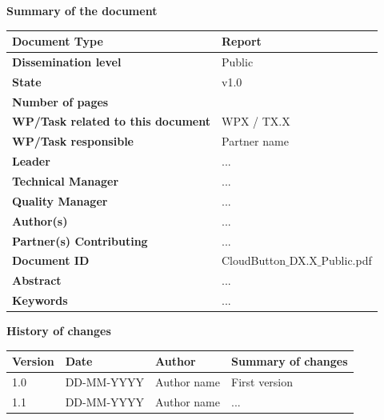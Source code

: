 \documentclass[a4paper,11pt]{article}
\numberwithin{table}{subsection} %
\begin{document}
{
\def\arraystretch{1.5} %

{\LARGE \textbf{Summary of the document}}

\begin{center}
    \begin{tabular}{ | l | p{10cm} |}
    \hline
    \cellcolor{gray!25} \textbf{Document Type} & Report  \\ \hline
    \cellcolor{gray!25} \textbf{Dissemination level} & Public \\ \hline
    \cellcolor{gray!25} \textbf{State} & v1.0 \\ \hline
    \cellcolor{gray!25} \textbf{Number of pages} & \pageref{LastPage} \\ \hline
    \cellcolor{gray!25} \textbf{WP/Task related to this document} & WPX / TX.X \\ \hline
    \cellcolor{gray!25} \textbf{WP/Task responsible} & Partner name  \\ \hline
    \cellcolor{gray!25} \textbf{Leader} & ... \\ \hline
    \cellcolor{gray!25} \textbf{Technical Manager} & ... \\ \hline
    \cellcolor{gray!25} \textbf{Quality Manager} & ... \\ \hline
    \cellcolor{gray!25} \textbf{Author(s)} & ... \\ \hline
    \cellcolor{gray!25} \textbf{Partner(s) Contributing} & ... \\ \hline
    \cellcolor{gray!25} \textbf{Document ID} & CloudButton$\_$DX.X$\_$Public.pdf \\ \hline
    \cellcolor{gray!25} \textbf{Abstract} & ... \\ \hline
    \cellcolor{gray!25} \textbf{Keywords} & ... \\ \hline
    \end{tabular}
\end{center}
}


\newpage\pagestyle{empty}

{
\def\arraystretch{1.5} %

{\LARGE \textbf{History of changes}}

\begin{center}
    \begin{tabular}{ | l | l | p{3cm} | p{9cm} | }
    \hline
    \rowcolor[gray]{0.8}
    \textbf{Version} &
    \textbf{Date} &
    \textbf{Author} &
    \textbf{Summary of changes} \\ \hline

    1.0 & DD-MM-YYYY & Author name & First version \\ \hline
    1.1 & DD-MM-YYYY & Author name & ... \\ \hline
    \end{tabular}
\end{center}
}
\end{document}
